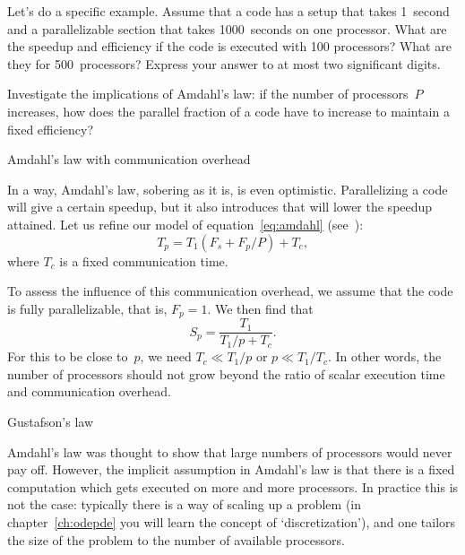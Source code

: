 \begin{exercise}
  Let's do a specific example. Assume that a code has a setup that
  takes 1~second and a parallelizable section that takes 1000~seconds
  on one processor. What are the speedup and efficiency if the code is
  executed with 100 processors? What are they for 500~processors?
  Express your answer to at most two significant digits.
\end{exercise}

\begin{exercise}
  Investigate the implications of Amdahl's law: if the number of
  processors~$P$ increases, how does the parallel fraction of a code
  have to increase to maintain a fixed efficiency?
\end{exercise}


 {Amdahl's law with communication overhead}

In a way, Amdahl's law, sobering as it is, is even optimistic.
Parallelizing a code will give a certain speedup, but it also
introduces  that will lower the
speedup attained. Let us refine our model of
equation~\eqref{eq:amdahl} (see~\cite[p.~367]{Landau:comp-phys}):
\[ T_p= T_1(F_s+F_p/P) +T_c, \]
where $T_c$ is a fixed communication time.

To assess the influence of this communication overhead, we assume that
the code is fully parallelizable, that is, $F_p=1$. We then find that
\begin{equation}
    S_p=\frac{T_1}{T_1/p+T_c}.
    \label{eq:amdahl-comm}
\end{equation}
For this to be close to~$p$, we need $T_c\ll T_1/p$ or $p\ll
T_1/T_c$. In other words, the number of processors should not grow
beyond the ratio of scalar execution time and communication overhead.

 {Gustafson's law}

Amdahl's law was thought to show that large numbers of processors
would never pay off. However, the implicit assumption in Amdahl's law
is that there is a fixed computation which gets executed on more and
more processors. In practice this is not the case: typically there is
a way of scaling up a problem (in chapter~\ref{ch:odepde} you will
learn the concept of `discretization'), and one
tailors the size of the problem to the number of available processors.

